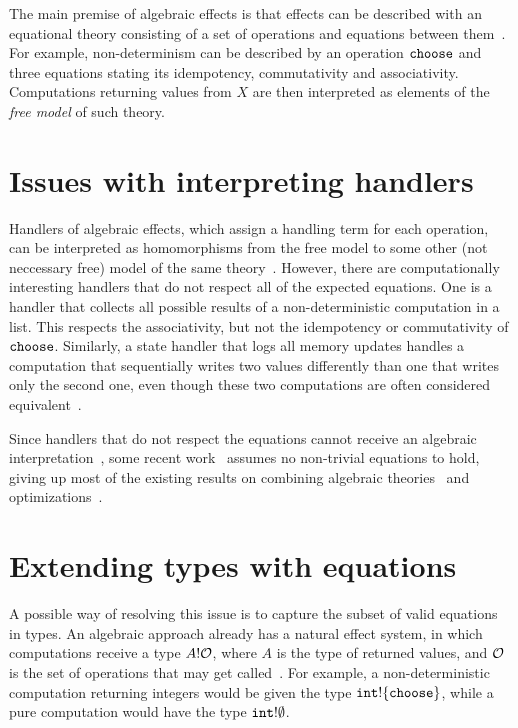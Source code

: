 \documentclass[a4paper,UKenglish]{dagrep}
\begin{document}
The main premise of algebraic effects is that effects can be described with an equational theory consisting of a set of operations and equations between them~\cite{DBLP:journals/acs/PlotkinP03}. For example, non-determinism can be described by an operation $\mathtt{choose}$ and three equations stating its idempotency, commutativity and associativity. Computations returning values from $X$ are then interpreted as elements of the \emph{free model} of such theory.

\section{Issues with interpreting handlers}

Handlers of algebraic effects, which assign a handling term for each operation, can be interpreted as homomorphisms from the free model to some other (not neccessary free) model of the same theory~\cite{DBLP:journals/corr/PlotkinP13}. However, there are computationally interesting handlers that do not respect all of the expected equations. One is a handler that collects all possible results of a non-deterministic computation in a list. This respects the associativity, but not the idempotency or commutativity of $\mathtt{choose}$. Similarly, a state handler that logs all memory updates handles a computation that sequentially writes two values differently than one that writes only the second one, even though these two computations are often considered equivalent~\cite{DBLP:conf/fossacs/PlotkinP02}.

Since handlers that do not respect the equations cannot receive an algebraic interpretation~\cite{DBLP:journals/corr/PlotkinP13}, some recent work~\cite{DBLP:journals/corr/BauerP13,DBLP:conf/icfp/KammarLO13} assumes no non-trivial equations to hold, giving up most of the existing results on combining algebraic theories~\cite{DBLP:journals/tcs/HylandPP06} and optimizations~\cite{DBLP:conf/popl/KammarP12}.

\section{Extending types with equations}

A possible way of resolving this issue is to capture the subset of valid equations in types. An algebraic approach already has a natural effect system, in which computations receive a type $A ! \mathcal{O}$, where $A$ is the type of returned values, and $\mathcal{O}$ is the set of operations that may get called~\cite{DBLP:journals/corr/BauerP13,DBLP:conf/icfp/KammarLO13}. For example, a non-deterministic computation returning integers would be given the type $\mathtt{int} ! \{ \mathtt{choose} \}$, while a pure computation would have the type $\mathtt{int} ! \emptyset$.
\end{document}
